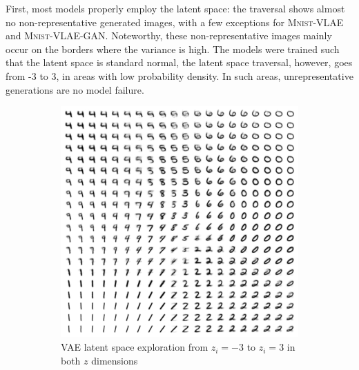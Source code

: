 First, most models properly employ the latent space: the traversal shows almost no non-representative generated images, with a few exceptions for \textsc{Mnist}-\ac{VLAE} and \textsc{Mnist}-\ac{VLAE}-\ac{GAN}.
Noteworthy, these non-representative images mainly occur on the borders where the variance is high.
The models were trained such that the latent space is standard normal, the latent space traversal, however, goes from -3 to 3, in areas with low probability density.
In such areas, unrepresentative generations are no model failure.

\begin{figure}
    \centering
    \begin{subfigure}{.45\textwidth}
        \centering
        \includegraphics[width=\textwidth]{images/latent_space_traversals/vae_mnist.png}
        \caption{VAE latent space exploration from $z_i=-3$ to $z_i=3$ in both $z$ dimensions}
    \end{subfigure}
    \hfill
    \begin{subfigure}{.45\textwidth}
        \centering

\end{subfigure}
\end{figure}

